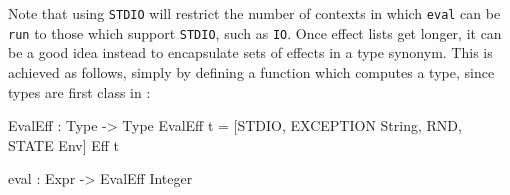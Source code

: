 \noindent
Note that using \texttt{STDIO} will restrict the number of contexts 
in which \texttt{eval} can be \texttt{run} to those which support \texttt{STDIO},
such as \texttt{IO}.
Once effect lists get longer, it can be a good idea instead
to encapsulate sets of effects in a type synonym. This is achieved as follows,
simply by defining a function which computes a type, since types are first
class in \Idris{}:

\begin{code}
EvalEff : Type -> Type
EvalEff t = { [STDIO, EXCEPTION String, RND, STATE Env] } Eff t
  
eval : Expr -> EvalEff Integer
\end{code}



